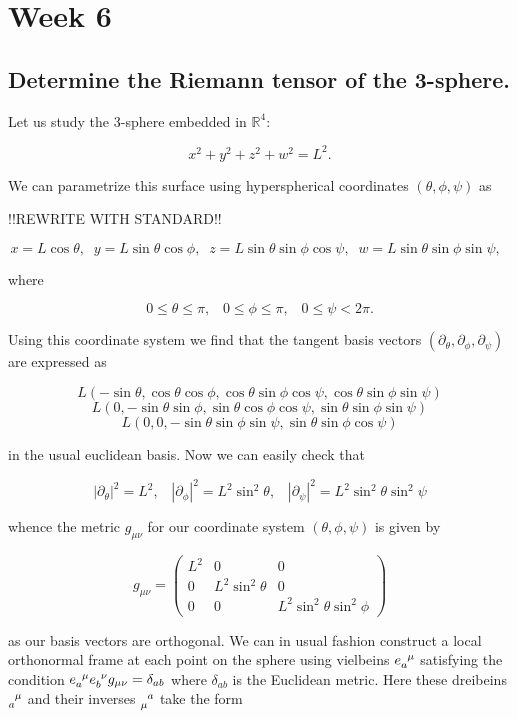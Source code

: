 \section{Week 6}
\subsection{Determine the Riemann tensor of the 3-sphere.}

Let us study the 3-sphere embedded in $\mathbb{R}^4$:

$$
x^2+y^2+z^2+w^2=L^2.
$$

We can parametrize this surface using hyperspherical coordinates $(\theta, \phi, \psi)$ as 

!!REWRITE WITH STANDARD!!

$$
x=L\cos\theta,\;\;y=L\sin\theta\cos\phi,\;\;z=L\sin\theta\sin\phi\cos\psi,\;\;w=L\sin\theta\sin\phi\sin\psi,\;\;
$$

where

$$
0\leq\theta\leq\pi,\;\;\;0\leq\phi\leq\pi,\;\;\;0\leq\psi<2\pi.
$$

Using this coordinate system we find that the tangent basis vectors $(\partial_\theta, \partial_\phi, \partial_\psi)$ are expressed as 

$$
L\left(-\sin\theta, \cos\theta\cos\phi, \cos\theta\sin\phi\cos\psi, \cos\theta\sin\phi\sin\psi\right)
$$
$$
L\left(0, -\sin\theta\sin\phi, \sin\theta\cos\phi\cos\psi, \sin\theta\sin\phi\sin\psi\right)
$$
$$
L\left(0, 0, -\sin\theta\sin\phi\sin\psi, \sin\theta\sin\phi\cos\psi\right)
$$

in the usual euclidean basis. Now we can easily check that 

$$
|\partial_\theta|^2=L^2,\;\;\;|\partial_\phi|^2=L^2\sin^2\theta,\;\;\;|\partial_\psi|^2=L^2\sin^2\theta\sin^2\psi
$$

whence the metric $g_{\mu\nu}$ for our coordinate system $(\theta, \phi, \psi)$ is given by

\begin{equation*}
g_{\mu\nu}=\left(
\begin{array}{ccc}
L^2 & 0 & 0\\
0 & L^2\sin^2\theta & 0\\
0 & 0 & L^2\sin^2\theta\sin^2\phi
\end{array}
\right)
\end{equation*}

as our basis vectors are orthogonal. We can in usual fashion construct a local orthonormal frame at each point on the sphere using vielbeins $e\eii{a}{\mu}$ satisfying the condition $e\eii{a}{\mu}e\eii{b}{\nu}g_{\mu\nu}=\delta_{ab}$ where $\delta_{ab}$ is the Euclidean metric. Here these dreibeins $\eii{a}{\mu}$ and their inverses $\eii{\mu}{a}$ take the form

